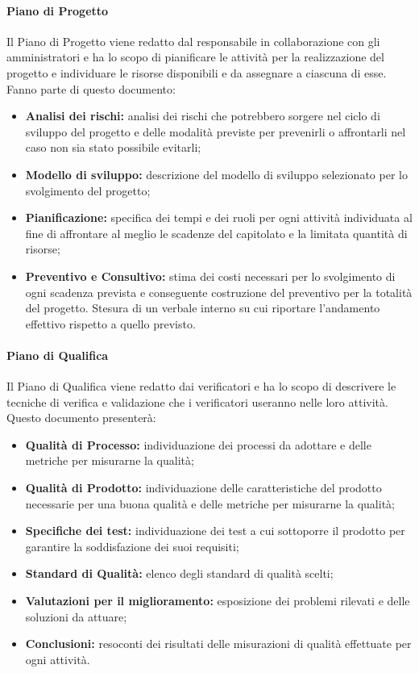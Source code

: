 \paragraph{Piano di Progetto}
Il Piano di Progetto viene redatto dal responsabile in collaborazione con gli amministratori e ha lo scopo di pianificare le attività per la realizzazione del progetto e individuare le risorse disponibili e da assegnare a ciascuna di esse.
Fanno parte di questo documento:
\begin{itemize}
	\item \textbf{Analisi dei rischi:} analisi dei rischi che potrebbero sorgere nel ciclo di sviluppo del progetto e delle modalità previste per prevenirli o affrontarli nel caso non sia stato possibile evitarli;
	\item \textbf{Modello di sviluppo:} descrizione del modello di sviluppo selezionato per lo svolgimento del progetto;
	\item \textbf{Pianificazione:} specifica dei tempi e dei ruoli per ogni attività individuata al fine di affrontare al meglio le scadenze del capitolato e la limitata quantità di risorse;
	\item \textbf{Preventivo e Consultivo:} stima dei costi necessari per lo svolgimento di ogni scadenza prevista e conseguente costruzione del preventivo per la totalità del progetto. Stesura di un verbale interno su cui riportare l'andamento effettivo rispetto a quello previsto.
\end{itemize}
\paragraph{Piano di Qualifica}
Il Piano di Qualifica viene redatto dai verificatori e ha lo scopo di descrivere le tecniche di verifica e validazione che i verificatori useranno nelle loro attività.
Questo documento presenterà:
\begin{itemize}
	\item \textbf{Qualità di Processo:} individuazione dei processi da adottare e delle metriche per misurarne la qualità;
	\item \textbf{Qualità di Prodotto:} individuazione delle caratteristiche del prodotto necessarie per una buona qualità e delle metriche per misurarne la qualità;
	\item \textbf{Specifiche dei test:} individuazione dei test a cui sottoporre il prodotto per garantire la soddisfazione dei suoi requisiti;
	\item \textbf{Standard di Qualità:} elenco degli standard di qualità scelti;
	\item \textbf{Valutazioni per il miglioramento:} esposizione dei problemi rilevati e delle soluzioni da attuare;
	\item \textbf{Conclusioni:} resoconti dei risultati delle misurazioni di qualità effettuate per ogni attività.
\end{itemize}

